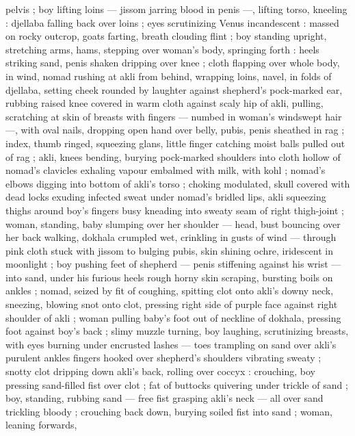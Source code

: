 pelvis ; boy lifting loins --- jissom jarring blood in penis ---, lifting 
torso, kneeling : djellaba falling back over loins ; eyes scrutinizing 
Venus incandescent : massed on rocky outcrop, goats farting, breath 
clouding flint ; boy standing upright, stretching arms, hams, stepping 
over woman's body, springing forth : heels striking sand, penis 
shaken dripping over knee ; cloth flapping over whole body, in wind, 
nomad rushing at akli from behind, wrapping loins, navel, in folds of 
djellaba, setting cheek rounded by laughter against shepherd's 
pock-marked ear, rubbing raised knee covered in warm cloth against 
scaly hip of akli, pulling, scratching at skin of breasts with fingers --- 
numbed in woman's windswept hair ---, with oval nails, dropping 
open hand over belly, pubis, penis sheathed in rag ; index, thumb 
ringed, squeezing glans, little finger catching moist balls pulled out 
of rag ; akli, knees bending, burying pock-marked shoulders into 
cloth {\col} hollow of nomad's clavicles exhaling vapour embalmed with 
milk, with kohl ; nomad's elbows digging into bottom of akli's torso 
; choking modulated, skull covered with dead locks exuding infected 
sweat under nomad's bridled lips, akli squeezing thighs around boy's 
fingers busy kneading into sweaty seam of right thigh-joint ; woman, 
standing, baby slumping over her shoulder --- head, bust bouncing 
over her back {\dashcom} walking, dokhala crumpled wet, crinkling in gusts 
of wind --- through pink cloth stuck with jissom to bulging pubis, skin 
shining ochre, iridescent in moonlight ; boy pushing feet of shepherd 
--- penis stiffening against his wrist --- into sand, under his furious 
heels {\col} rough horny skin scraping, bursting boils on ankles ; nomad, 
seized by fit of coughing, spitting clot onto akli's downy neck, 
sneezing, blowing snot onto clot, pressing right side of purple face 
against right shoulder of akli ; woman pulling baby's foot out of 
neckline of dokhala, pressing foot against boy's back ; slimy muzzle 
turning, boy laughing, scrutinizing breasts, with eyes burning under 
encrusted lashes --- toes trampling on sand over akli's purulent 
ankles {\col} fingers hooked over shepherd's shoulders vibrating sweaty 
; snotty clot dripping down akli's back, rolling over coccyx : 
crouching, boy pressing sand-filled fist over clot ; fat of buttocks 
quivering under trickle of sand ; boy, standing, rubbing sand --- free 
fist grasping akli's neck --- all over sand trickling bloody ; crouching 
back down, burying soiled fist into sand ; woman, leaning forwards, 
